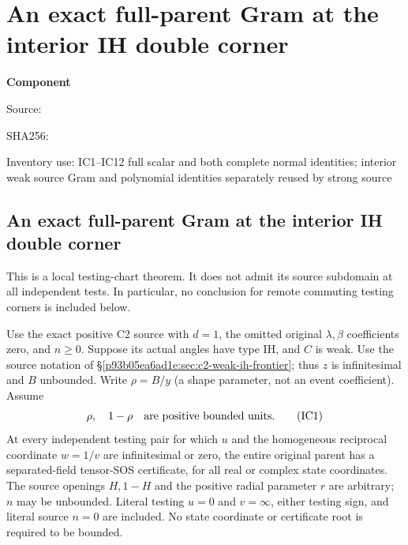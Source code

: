 \chapter{An exact full-parent Gram at the interior IH double corner}
\label{component:pc00b84929b12}
\noindent\textbf{Component }\par
{\small\noindent Source: \par}
{\small\noindent SHA256: \par}
{\small\noindent Inventory use: IC1--IC12 full scalar and both complete normal identities; interior weak source Gram and polynomial identities separately reused by strong source\par}
\medskip
\section[An exact full-parent Gram at the interior IH double corner]{An exact full-parent Gram at the interior IH double corner}
\label{pc00b84929b12:sec:c2-weak-ih-interior-corner}

This is a local testing-chart theorem. It does not admit its source
subdomain at all independent tests. In particular, no conclusion for
remote commuting testing corners is included below.

\begin{theorem}
Use the exact positive C2 source with $d=1$, the omitted original
$\lambda,\beta$ coefficients zero, and $n\ge0$. Suppose its actual
angles have type IH, and $C$ is weak. Use the source notation of
\S\ref{p93b05ea6ad1e:sec:c2-weak-ih-frontier}; thus $z$ is infinitesimal and
$B$ unbounded. Write $\rho=B/y$ (a shape parameter, not an event
coefficient). Assume
\[
 \rho,\quad1-\rho
 \quad\hbox{are positive bounded units}.                 \tag{IC1}
\]
At every independent testing pair for which $u$ and the homogeneous
reciprocal coordinate $w=1/v$ are infinitesimal or zero, the entire
original parent has a separated-field tensor-SOS certificate, for
all real or complex state coordinates. The source openings $H,1-H$ and the positive radial parameter $r$
are arbitrary; $n$ may be unbounded. Literal
testing $u=0$ and $v=\infty$, either testing sign, and literal source
$n=0$ are included.
No state coordinate or certificate root is required to be bounded.
\end{theorem}

